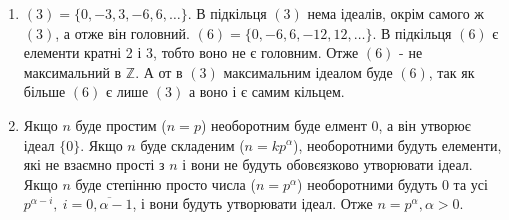 \documentclass[a4paper,12pt]{article}
\begin{document}
\begin{justify}
\begin{enumerate}
 			\item $(3)=\{0,-3,3,-6,6,\dots\}$. В підкільця $(3)$ нема ідеалів, окрім самого ж $(3)$, а отже він головний. $(6)=\{0,-6,6,-12,12,\dots\}$. В підкільця $(6)$ є елементи кратні 2 і 3, тобто воно не є головним. Отже $(6)$ - не максимальний в $\mathbb{Z}$. А от в $(3)$ максимальним ідеалом буде $(6)$, так як більше $(6)$ є лише $(3)$ а воно і є самим кільцем.
 			\item Якщо $n$ буде простим ($n=p$) необоротним буде елмент 0, а він утворює ідеал $\{0\}$. Якщо $n$ буде складеним ($n=kp^\alpha$), необоротними будуть елементи, які не взаємно прості з $n$ і вони не будуть обовєязково утворювати ідеал. Якщо $n$ буде степінню просто числа ($n=p^\alpha$) необоротними будуть 0 та усі $p^{\alpha-i},\>i=\overline{0,\alpha-1}$, і вони будуть утворювати ідеал. Отже $n=p^\alpha,\alpha>0$.
 		\end{enumerate}
 	\end{justify}
\end{document}
